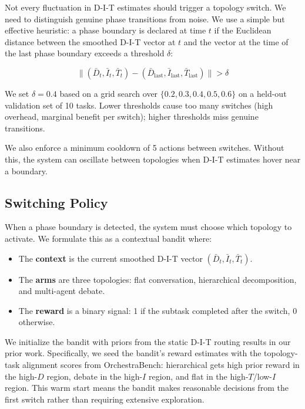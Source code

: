 Not every fluctuation in D-I-T estimates should trigger a topology
switch. We need to distinguish genuine phase transitions from noise. We
use a simple but effective heuristic: a phase boundary is declared at
time \(t\) if the Euclidean distance between the smoothed D-I-T vector
at \(t\) and the vector at the time of the last phase boundary exceeds a
threshold \(\delta\):

\begin{equation}
\| (\bar{D}_t, \bar{I}_t, \bar{T}_t) - (\bar{D}_{\text{last}}, \bar{I}_{\text{last}}, \bar{T}_{\text{last}}) \| > \delta
\end{equation}

We set \(\delta = 0.4\) based on a grid search over
\(\{0.2, 0.3, 0.4, 0.5, 0.6\}\) on a held-out validation set of 10
tasks. Lower thresholds cause too many switches (high overhead, marginal
benefit per switch); higher thresholds miss genuine transitions.

We also enforce a minimum cooldown of 5 actions between switches.
Without this, the system can oscillate between topologies when D-I-T
estimates hover near a boundary.

\subsection{Switching Policy}\label{switching-policy}

When a phase boundary is detected, the system must choose which topology
to activate. We formulate this as a contextual bandit
\citep{banditllm_2025} where:

\begin{itemize}
\item The \textbf{context} is the current smoothed D-I-T vector $(\bar{D}_t, \bar{I}_t, \bar{T}_t)$.
\item The \textbf{arms} are three topologies: flat conversation, hierarchical decomposition, and multi-agent debate.
\item The \textbf{reward} is a binary signal: 1 if the subtask completed after the switch, 0 otherwise.
\end{itemize}

We initialize the bandit with priors from the static D-I-T routing
results in our prior work. Specifically, we seed the bandit's reward
estimates with the topology-task alignment scores from OrchestraBench:
hierarchical gets high prior reward in the high-\(D\) region, debate in
the high-\(I\) region, and flat in the high-\(T\)/low-\(I\) region. This
warm start means the bandit makes reasonable decisions from the first
switch rather than requiring extensive exploration.

